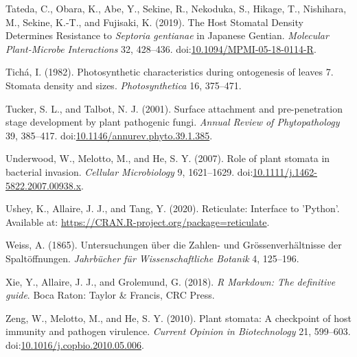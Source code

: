 \documentclass[utf8]{frontiersSCNS}
\newlength{\cslhangindent}
\newenvironment{cslreferences}%
  {\setlength{\parindent}{0pt}%
  \everypar{\setlength{\hangindent}{\cslhangindent}}\ignorespaces}%
  {\par}
\begin{document}
\begin{cslreferences}
\leavevmode\hypertarget{ref-tateda_host_2019}{}%
Tateda, C., Obara, K., Abe, Y., Sekine, R., Nekoduka, S., Hikage, T.,
Nishihara, M., Sekine, K.-T., and Fujisaki, K. (2019). The Host Stomatal
Density Determines Resistance to \emph{Septoria gentianae} in Japanese
Gentian. \emph{Molecular Plant-Microbe Interactions} 32, 428--436.
doi:\href{https://doi.org/10.1094/MPMI-05-18-0114-R}{10.1094/MPMI-05-18-0114-R}.

\leavevmode\hypertarget{ref-ticha_photosynthetic_1982}{}%
Tichá, I. (1982). Photosynthetic characteristics during ontogenesis of
leaves 7. Stomata density and sizes. \emph{Photosynthetica} 16,
375--471.

\leavevmode\hypertarget{ref-tucker_surface_2001}{}%
Tucker, S. L., and Talbot, N. J. (2001). Surface attachment and
pre-penetration stage development by plant pathogenic fungi.
\emph{Annual Review of Phytopathology} 39, 385--417.
doi:\href{https://doi.org/10.1146/annurev.phyto.39.1.385}{10.1146/annurev.phyto.39.1.385}.

\leavevmode\hypertarget{ref-underwood_role_2007}{}%
Underwood, W., Melotto, M., and He, S. Y. (2007). Role of plant stomata
in bacterial invasion. \emph{Cellular Microbiology} 9, 1621--1629.
doi:\href{https://doi.org/10.1111/j.1462-5822.2007.00938.x}{10.1111/j.1462-5822.2007.00938.x}.

\leavevmode\hypertarget{ref-ushey_reticulate_2020}{}%
Ushey, K., Allaire, J. J., and Tang, Y. (2020). Reticulate: Interface to
'Python'. Available at:
\url{https://CRAN.R-project.org/package=reticulate}.

\leavevmode\hypertarget{ref-weiss_untersuchungen_1865}{}%
Weiss, A. (1865). Untersuchungen über die Zahlen- und
Grössenverhältnisse der Spaltöffnungen. \emph{Jahrbücher für
Wissenschaftliche Botanik} 4, 125--196.

\leavevmode\hypertarget{ref-xie_r_2018}{}%
Xie, Y., Allaire, J. J., and Grolemund, G. (2018). \emph{R Markdown: The
definitive guide}. Boca Raton: Taylor \& Francis, CRC Press.

\leavevmode\hypertarget{ref-zeng_plant_2010}{}%
Zeng, W., Melotto, M., and He, S. Y. (2010). Plant stomata: A checkpoint
of host immunity and pathogen virulence. \emph{Current Opinion in
Biotechnology} 21, 599--603.
doi:\href{https://doi.org/10.1016/j.copbio.2010.05.006}{10.1016/j.copbio.2010.05.006}.
\end{cslreferences}
\end{document}
